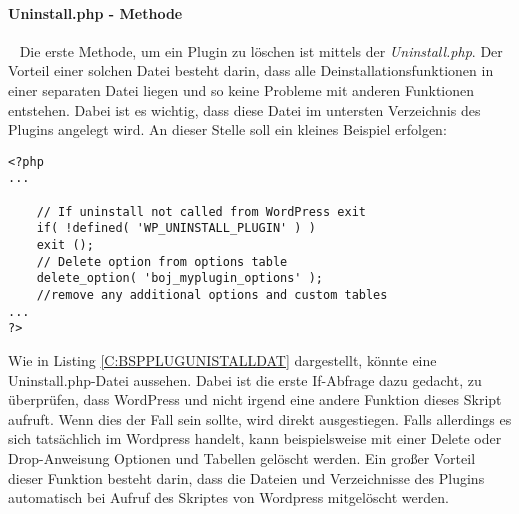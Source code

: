 \paragraph{Uninstall.php - Methode}\ \newline
Die erste Methode, um ein Plugin zu löschen ist mittels der \emph{Uninstall.php}. Der Vorteil einer solchen Datei besteht darin, dass alle Deinstallationsfunktionen in einer separaten Datei liegen und so keine Probleme mit anderen Funktionen entstehen. Dabei ist es wichtig, dass diese Datei im untersten Verzeichnis des Plugins angelegt wird. An dieser Stelle soll ein kleines Beispiel erfolgen:
\begin{lstlisting}
<?php
...

	// If uninstall not called from WordPress exit 
	if( !defined( 'WP_UNINSTALL_PLUGIN' ) )
	exit ();
	// Delete option from options table 
	delete_option( 'boj_myplugin_options' );
	//remove any additional options and custom tables 
...
?>
\end{lstlisting}
Wie in Listing \ref{C:BSPPLUGUNISTALLDAT} dargestellt, könnte eine Uninstall.php-Datei aussehen. \newline
Dabei ist die erste If-Abfrage dazu gedacht, zu überprüfen, dass WordPress und nicht irgend eine andere Funktion dieses Skript aufruft. Wenn dies der Fall sein sollte, wird direkt ausgestiegen.\newline
Falls allerdings es sich tatsächlich im Wordpress handelt, kann beispielsweise mit einer Delete oder Drop-Anweisung Optionen und Tabellen gelöscht werden.\newline
Ein großer Vorteil dieser Funktion besteht darin, dass die Dateien und Verzeichnisse des Plugins automatisch bei Aufruf des Skriptes von Wordpress mitgelöscht werden. 
